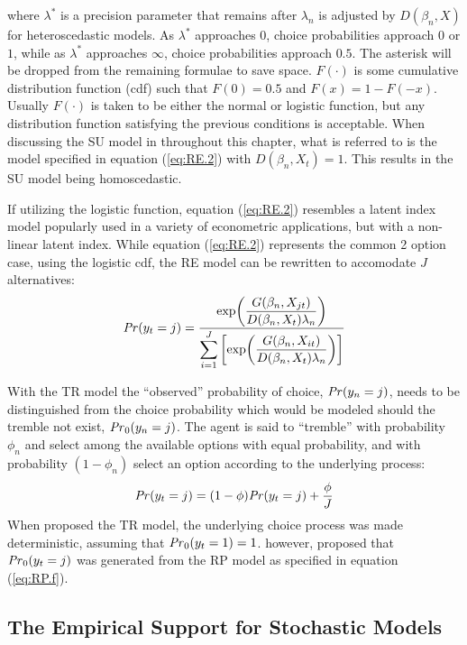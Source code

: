 \noindent where $\lambda^*$ is a precision parameter that remains after $\lambda_n$ is adjusted by $D(\beta_n,X)$ for heteroscedastic models.
As $\lambda^*$ approaches $0$, choice probabilities approach $0$ or $1$, while as $\lambda^*$ approaches $\infty$, choice probabilities approach $0.5$.
The asterisk will be dropped from the remaining formulae to save space.
$F(\cdot)$ is some cumulative distribution function (cdf) such that $F(0) = 0.5$ and $F(x) = 1 - F(-x)$.
Usually $F(\cdot)$ is taken to be either the normal or logistic function, but any distribution function satisfying the previous conditions is acceptable.
When discussing the SU model in throughout this chapter, what is referred to is the model specified in equation (\ref{eq:RE.2}) with $D(\beta_n,X_t) = 1$.
This results in the SU model being homoscedastic.

If utilizing the logistic function, equation (\ref{eq:RE.2}) resembles a latent index model popularly used in a variety of econometric applications, but with a non-linear latent index.
While equation (\ref{eq:RE.2}) represents the common 2 option case, using the logistic cdf, the RE model can be rewritten to accomodate $J$ alternatives:
\begin{equation}
	\label{eq:RE.f}
	{\ensuremath{\mathit{Pr}}}(y_t=j) =\dfrac{\exp\!\left( \dfrac{ G(\beta_n,X_{jt}) }{ D(\beta_n,X_{t})\lambda_n }  \right)}{ \displaystyle\sum_{i=1}^J \left[ \exp\!\left( \dfrac{ G(\beta_n,X_{it}) }{ D(\beta_n,X_{t})\lambda_n }  \right)  \right]  } 
\end{equation}

With the TR model the \enquote{observed} probability of choice, ${\mathit{Pr}}(y_n=j)$, needs to be distinguished from the choice probability which would be modeled should the tremble not exist, ${\mathit{Pr}}_0(y_n=j)$.
The agent is said to \enquote{tremble} with probability $\phi_n$ and select among the available options with equal probability, and with probability $(1-\phi_n)$ select an option according to the underlying process:
\begin{equation}
	\label{eq:TR.f}
	{\ensuremath{\mathit{Pr}}}(y_t=j) = (1-\phi) {\mathit{Pr}}(y_t=j) + \frac{\phi}{J}
\end{equation}
When \textcite{Harless1994} proposed the TR model, the underlying choice process was made deterministic, assuming that ${\mathit{Pr}}_0(y_t=1) = 1$.
\textcite{Loomes2002} however, proposed that ${\mathit{Pr}}_0(y_t=j)$ was generated from the RP model as specified in equation (\ref{eq:RP.f}).

\subsection{The Empirical Support for Stochastic Models}

